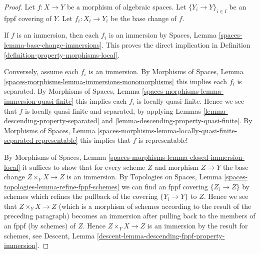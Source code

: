 \documentclass[10pt,a4paper]{amsart}
\theoremstyle{plain}
\theoremstyle{definition}
\theoremstyle{remark}
\numberwithin{equation}{subsection}
\begin{document}
\begin{proof}
Let $f : X \to Y$ be a morphism of algebraic spaces.
Let $\{Y_i \to Y\}_{i \in I}$ be an fppf covering of $Y$.
Let $f_i : X_i \to Y_i$ be the base change of $f$.

\medskip\noindent
If $f$ is an immersion, then each $f_i$ is an immersion by
Spaces, Lemma \ref{spaces-lemma-base-change-immersions}.
This proves the direct implication in
Definition \ref{definition-property-morphisms-local}.

\medskip\noindent
Conversely, assume each $f_i$ is an immersion. By
Morphisms of Spaces,
Lemma \ref{spaces-morphisms-lemma-immersions-monomorphisms}
this implies each $f_i$ is separated. By
Morphisms of Spaces,
Lemma \ref{spaces-morphisms-lemma-immersion-quasi-finite}
this implies each $f_i$ is locally quasi-finite.
Hence we see that $f$ is locally quasi-finite and separated, by applying
Lemmas \ref{lemma-descending-property-separated}
and \ref{lemma-descending-property-quasi-finite}.
By
Morphisms of Spaces, Lemma
\ref{spaces-morphisms-lemma-locally-quasi-finite-separated-representable}
this implies that $f$ is representable!

\medskip\noindent
By
Morphisms of Spaces, Lemma \ref{spaces-morphisms-lemma-closed-immersion-local}
it suffices to show that for every scheme $Z$ and morphism $Z \to Y$
the base change $Z \times_Y X \to Z$ is an immersion. By
Topologies on Spaces, Lemma \ref{spaces-topologies-lemma-refine-fppf-schemes}
we can find an fppf covering $\{Z_i \to Z\}$ by schemes which refines
the pullback of the covering $\{Y_i \to Y\}$ to $Z$.
Hence we see that $Z \times_Y X \to Z$ (which is a morphism of schemes
according to the result of the preceding paragraph) becomes an immersion
after pulling back to the members of an fppf (by schemes) of $Z$.
Hence $Z \times_Y X \to Z$ is an immersion by the result for schemes, see
Descent, Lemma \ref{descent-lemma-descending-fppf-property-immersion}.
\end{proof}
\end{document}
